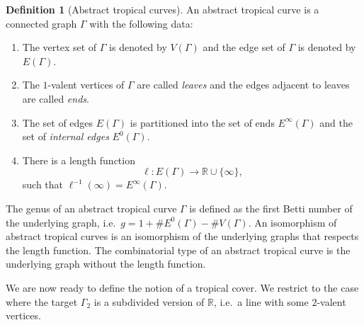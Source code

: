 \documentclass[10pt]{amsart}
\theoremstyle{plain}
\theoremstyle{definition}
\newtheorem{defi}[defi]{Definition}
\theoremstyle{definition}
\theoremstyle{plain}
\theoremstyle{plain}
\theoremstyle{remark}
\theoremstyle{plain}
\theoremstyle{plain}
\begin{document}
\begin{defi}[Abstract tropical curves]
An abstract tropical curve is a connected graph $\Gamma$ with the following data:
\begin{enumerate}
    \item The vertex set of $\Gamma$ is denoted by $V(\Gamma)$ and the edge set of $\Gamma$ is denoted by $E(\Gamma)$.
    \item The $1$-valent vertices of $\Gamma$ are called \textit{leaves} and the edges adjacent to leaves are called \textit{ends}.
    \item The set of edges $E(\Gamma)$ is partitioned into the set of ends $E^\infty(\Gamma)$ and the set of \textit{internal edges} $E^0(\Gamma)$.
    \item There is a length function
    \begin{equation*}
        \ell\colon E(\Gamma)\to\mathbb{R}\cup\{\infty\},
    \end{equation*}
    such that $\ell^{-1}(\infty)=E^\infty(\Gamma)$.
\end{enumerate}
The genus of an abstract tropical curve $\Gamma$ is defined as the first Betti number of the underlying graph, i.e.\ $g=1+\# E^0(\Gamma)-\# V(\Gamma)$. An isomorphism of abstract tropical curves is an isomorphism of the underlying graphs that respects the length function. The combinatorial type of an abstract tropical curve is the underlying graph without the length function.
\end{defi}

We are now ready to define the notion of a tropical cover. We restrict to the case where the target $\Gamma_2$ is a subdivided version of $\mathbb{R}$, i.e.\ a line with some $2$-valent vertices.
\end{document}
